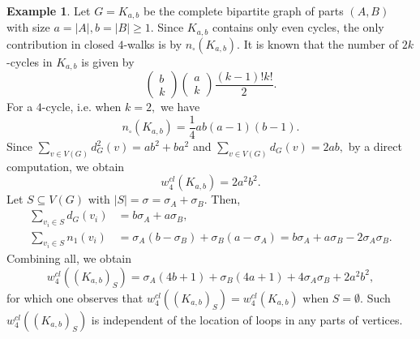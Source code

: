 \documentclass[12pt,a4paper,reqno]{amsart}
\numberwithin{equation}{section}
\theoremstyle{plain}
\theoremstyle{definition}
\newtheorem{example}[theorem]{Example}
\newcommand{\<}{\langle}
\renewcommand{\>}{\rangle}
\begin{document}
\begin{example}
\label{expKmn}
Let $G=K_{a,b}$ be the complete bipartite graph of parts $(A,B)$ with size $a=|A|,b=|B| \geq 1.$ Since $K_{a,b}$ contains only even cycles, the only contribution in closed $4$-walks is by $n_{\square}(K_{a,b}).$ It is known that the number of $2k$-cycles in $K_{a,b}$ is given by 
\[
\begin{pmatrix}
b \\ k 
\end{pmatrix}
\begin{pmatrix}
a \\ k 
\end{pmatrix}
\frac{(k-1)!k!}{2}.
\]
For a $4$-cycle, i.e. when $k=2,$ we have 
\[
n_{\square}(K_{a,b})= \frac{1}{4} ab(a-1)(b-1).
\]
Since $\sum_{v \in V(G)} d_G^2(v) = ab^2 + ba^2$ and $\sum_{v \in V(G)} d_G(v)= 2ab,$ by a direct computation, we obtain 
\[
w^{cl}_4(K_{a,b}) = 2a^2b^2.
\]
Let $S \subseteq V(G)$ with $|S|=\sigma=\sigma_A + \sigma_B.$ Then, 
\begin{align*}
\sum_{v_i \in S} d_G (v_i) &= b\sigma_A + a\sigma_B, \\
\sum_{v_i \in S} n_1(v_i) &= \sigma_A(b-\sigma_B) + \sigma_B(a-\sigma_A)= b\sigma_A + a\sigma_B -2\sigma_A\sigma_B. 
\end{align*}
Combining all, we obtain 
\begin{equation}
w_4^{cl}((K_{a,b})_S) = \sigma_A(4b+1) + \sigma_B(4a+1) + 4\sigma_A\sigma_B + 2a^2b^2,
\end{equation}
for which one observes that $w_4^{cl}((K_{a,b})_S)= w_4^{cl}(K_{a,b})$ when $S=\emptyset.$ Such $w_4^{cl}((K_{a,b})_S)$ is independent of the location of loops in any parts of vertices.
\end{example}

\end{document}
